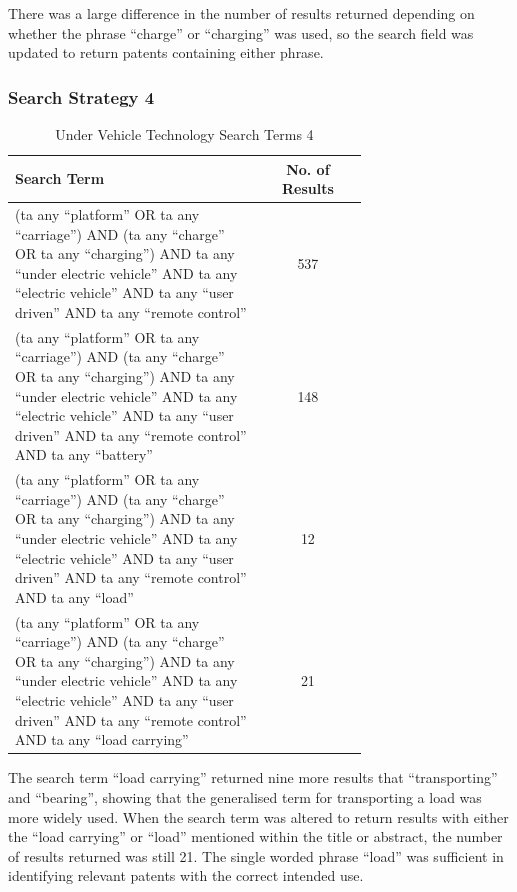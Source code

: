 \documentclass [12pt]{article}
\begin{document}
There was a large difference in the number of results returned depending on whether the phrase “charge” or “charging” was used, so the search field was updated to return patents containing either phrase.

\subsubsection{Search Strategy 4}

\begin{table}[H]
    \centering
    \setlength{\arrayrulewidth}{1.5pt}
    \begin{tabular}{|p{0.7\linewidth}|c|}
    \hline
    \cellcolor{gray!40}Search Term & \cellcolor{gray!40}No. of Results \\
    \hline
    (ta any “platform” OR ta any “carriage”) AND (ta any “charge” OR ta any “charging”) AND ta any “under electric vehicle” AND ta any “electric vehicle” AND ta any “user driven” AND ta any “remote control” & 537 \\
    \hline
    (ta any “platform” OR ta any “carriage”) AND (ta any “charge” OR ta any “charging”) AND ta any “under electric vehicle” AND ta any “electric vehicle” AND ta any “user driven” AND ta any “remote control” AND ta any “battery” & 148 \\
    \hline
    (ta any “platform” OR ta any “carriage”) AND (ta any “charge” OR ta any “charging”) AND ta any “under electric vehicle” AND ta any “electric vehicle” AND ta any “user driven” AND ta any “remote control” AND ta any “load” & 12 \\
    \hline
    (ta any “platform” OR ta any “carriage”) AND (ta any “charge” OR ta any “charging”) AND ta any “under electric vehicle” AND ta any “electric vehicle” AND ta any “user driven” AND ta any “remote control” AND ta any “load carrying” & 21 \\
    \hline
    \end{tabular}
    \caption{Under Vehicle Technology Search Terms 4}
    \label{table:under_vehicle_search_strat_4}
\end{table}

The search term “load carrying” returned nine more results that “transporting” and “bearing”, showing that the generalised term for transporting a load was more widely used. When the search term was altered to return results with either the “load carrying” or “load” mentioned within the title or abstract, the number of results returned was still 21. The single worded phrase “load” was sufficient in identifying relevant patents with the correct intended use.
\end{document}
